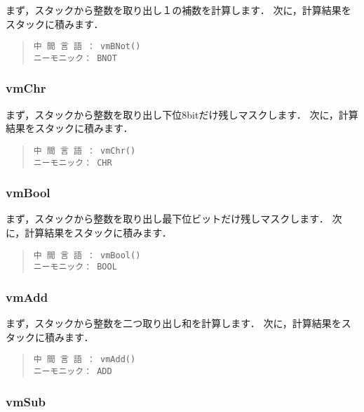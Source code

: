 まず，スタックから整数を取り出し１の補数を計算します．
次に，計算結果をスタックに積みます．

\begin{quote}
\begin{verbatim}
中 間 言 語 ： vmBNot()
ニーモニック： BNOT
\end{verbatim}
\end{quote}

\subsubsection{vmChr}

まず，スタックから整数を取り出し下位8bitだけ残しマスクします．
次に，計算結果をスタックに積みます．

\begin{quote}
\begin{verbatim}
中 間 言 語 ： vmChr()
ニーモニック： CHR
\end{verbatim}
\end{quote}

\subsubsection{vmBool}

まず，スタックから整数を取り出し最下位ビットだけ残しマスクします．
次に，計算結果をスタックに積みます．

\begin{quote}
\begin{verbatim}
中 間 言 語 ： vmBool()
ニーモニック： BOOL
\end{verbatim}
\end{quote}

\subsubsection{vmAdd}

まず，スタックから整数を二つ取り出し和を計算します．
次に，計算結果をスタックに積みます．

\begin{quote}
\begin{verbatim}
中 間 言 語 ： vmAdd()
ニーモニック： ADD
\end{verbatim}
\end{quote}

\subsubsection{vmSub}

